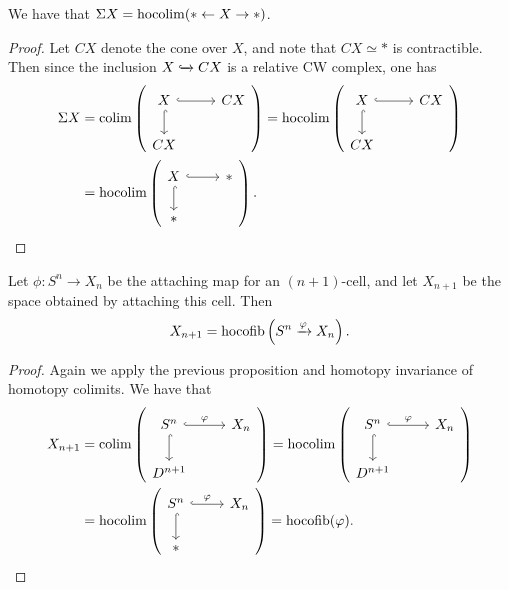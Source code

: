 \begin{example} We have that $\Sigma X = \mathop{\operatorname*{hocolim}}(\ast \leftarrow X \to \ast)$.
\end{example}
\begin{proof} Let $CX$ denote the cone over $X$, and note that $CX \simeq \ast$ is contractible. Then since the inclusion $X \xhookrightarrow{} CX$ is a relative CW complex, one has
\begin{align*}
    \Sigma X &= \colim \left( \begin{tikzcd}[ampersand replacement=\&] X\rar[hook]\dar[hook] \& CX \\ CX \& \end{tikzcd} \right) = \hocolim \left( \begin{tikzcd}[ampersand replacement=\&] X\rar[hook]\dar[hook] \& CX \\ CX \& \end{tikzcd} \right) \\
    &=\hocolim \left( \begin{tikzcd}[ampersand replacement=\&] X\rar[hook]\dar[hook] \& \ast \\ \ast \& \end{tikzcd} \right).
\end{align*}
\end{proof}

\begin{example} Let $\phi: S^n \to X_n$ be the attaching map for an $(n+1)$-cell, and let $X_{n+1}$ be the space obtained by attaching this cell. Then
\begin{align*}
    X_{n+1} = \text{hocofib}\left(S^n \xrightarrow{\varphi} X_n\right).
\end{align*}
\end{example}
\begin{proof} Again we apply the previous proposition and homotopy invariance of homotopy colimits. We have that
\begin{align*}
    X_{n+1} &= \colim \left( \begin{tikzcd}[ampersand replacement=\&] S^n\rar[hook,"\phi" above]\dar[hook] \& X_n \\ D^{n+1} \& \end{tikzcd} \right) = \hocolim \left( \begin{tikzcd}[ampersand replacement=\&] S^n\rar[hook,"\phi" above]\dar[hook] \& X_n \\ D^{n+1} \& \end{tikzcd} \right) \\
    &=\hocolim \left( \begin{tikzcd}[ampersand replacement=\&] S^n\rar[hook,"\phi" above]\dar[hook] \& X_n \\ \ast \& \end{tikzcd} \right) = \hocofib(\phi).
\end{align*}
\end{proof}

